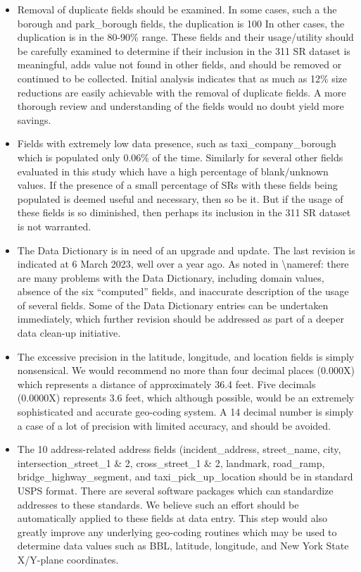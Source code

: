 \documentclass[12pt, titlepage]{article}
\begin{document}
{\begin{itemize}
	\item Removal of duplicate fields should be examined.  In some cases, such a the borough and park\_borough fields, the duplication is 100%
	In other cases, the duplication is in the 80-90\% range. These fields and their usage/utility should be carefully examined to determine if their
	inclusion in the 311 SR dataset is meaningful, adds value not found in other fields, and should be removed or continued to be collected.
	Initial analysis indicates that as much as 12\% size reductions are easily achievable with the removal of duplicate fields. A more thorough
	review and understanding of the fields would no doubt yield more savings. 
	
	\item Fields with extremely low data presence, such as taxi\_company\_borough which is populated only 0.06\% of the time. Similarly for several other fields 
	evaluated in this study which have a high percentage of blank/unknown values. If the presence of a small percentage of SRs 
	with these fields being populated is deemed useful and necessary, then so be it. But if the usage of these fields is so diminished, 
	then perhaps its inclusion in the 311 SR dataset is not warranted.
	
	\item The Data Dictionary is in need of an upgrade and update. The last revision is indicated at 6 March 2023, well over a year ago. 
	As noted in \textbackslash nameref:  there are many problems with the Data Dictionary, including domain
	values, absence of the six ``computed'' fields, and inaccurate description of the usage of several fields. Some of the Data Dictionary
	entries can be undertaken immediately, which further revision should be addressed as part of a deeper data clean-up initiative. 
	
	\item The excessive precision in the latitude, longitude, and location fields is simply nonsensical.  We would recommend no more than four
	decimal places (0.000X) which represents a distance of approximately 36.4 feet. Five decimals (0.0000X) represents 3.6 feet, which 
	although possible, would be an extremely sophisticated and accurate geo-coding system. A 14 decimal number is simply a case
	of a lot of precision with limited accuracy, and should be avoided.

	\item The 10 address-related address fields (incident\_address, street\_name, city, intersection\_street\_1 \& 2, cross\_street\_1 \& 2,  landmark,
	road\_ramp, bridge\_highway\_segment, and taxi\_pick\_up\_location should be in standard USPS format. 
	There are several software packages which can standardize addresses to these standards.
	We believe such an effort should be automatically applied to these fields at data entry. This step would also greatly improve any underlying geo-coding routines which
	may be used to determine data values such as BBL, latitude, longitude, and New York State X/Y-plane coordinates.
	

\end{itemize}}
\end{document}
